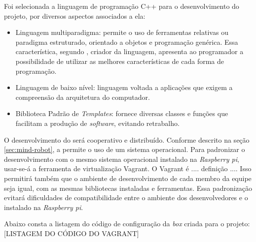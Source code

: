 \FloatBarrier
\par
Foi selecionada a linguagem de programação \textsf{C++} para o desenvolvimento
do projeto, por diversos aspectos associados a ela:
\begin{itemize}
  \item Linguagem multiparadigma: permite o uso de ferramentas relativas
  ou paradigma estruturado, orientado a objetos e programação genérica. Essa
  característica, segundo \cite{stroustrup2012}, criador da linguagem, apresenta
  ao programador a possibilidade de utilizar as melhores características de
  cada forma de programação.
  
  \item Linguagem de baixo nível: linguagem voltada a aplicações que exigem
  a compreensão da arquitetura do computador.
  
  \item Biblioteca Padrão de \textit{Templates}: fornece diversas classes e
  funções que facilitam a produção de \textit{software}, evitando retrabalho.
\end{itemize}
\par
O desenvolvimento do \software será cooperativo e distribuído. Conforme descrito na
seção \ref{sec:mind-robot}, a \rasp permite o uso de um sistema operacional. Para
padronizar o desenvolvimento com o mesmo sistema operacional instalado na
\textit{Raspberry pi}, usar-se-á a ferramenta de virtualização \textsf{Vagrant}.
O \textsf{Vagrant} é .... definição ....
Isso permitirá também que o ambiente de desenvolvimento de cada membro da equipe
seja igual, com as mesmas bibliotecas instaladas e ferramentas. Essa padronização
evitará dificuldades de compatibilidade entre o ambiente dos desenvolvedores e o
instalado na \textit{Raspberry pi}.
\par
Abaixo consta a listagem do código de configuração da \textit{box} criada para o
projeto:
[LISTAGEM DO CÓDIGO DO VAGRANT]